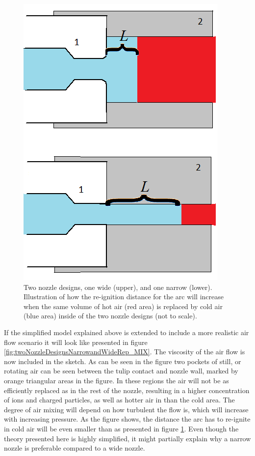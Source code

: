 \documentclass[10pt,b5paper,twoside]{article}
\begin{document}
\begin{figure}[H]
\centering
\includegraphics[scale=0.42]{Bilder/Results/nozzle_cooling_1.png}
\caption{Two nozzle designs, one wide (upper), and one narrow (lower). Illustration of how the re-ignition distance for the arc will increase when the same volume of hot air (red area) is replaced by cold air (blue area) inside of the two nozzle designs (not to scale).} \label{fig:twoNozzleDesignsNarrowandWideRep}
\end{figure}

If the simplified model explained above is extended to include a more realistic air flow scenario it will look like presented in figure \ref{fig:twoNozzleDesignsNarrowandWideRep_MIX}. The viscosity of the air flow is now included in the sketch. As can be seen in the figure two pockets of still, or rotating air can be seen between the tulip contact and nozzle wall, marked by orange triangular areas in the figure. In these regions the air will not be as efficiently replaced as in the rest of the nozzle, resulting in a higher concentration of ions and charged particles, as well as hotter air in than the cold area. The degree of air mixing will depend on how turbulent the flow is, which will increase with increasing pressure. As the figure shows, the distance the arc has to re-ignite in cold air will be even smaller than as presented in figure \ref{fig:twoNozzleDesignsNarrowandWideRep}. Even though the theory presented here is highly simplified, it might partially explain why a narrow nozzle is preferable compared to a wide nozzle. 
 
\end{document}
